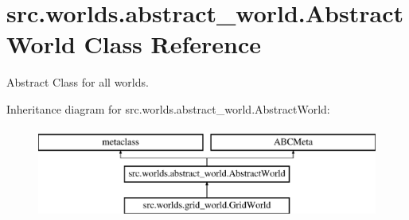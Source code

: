 \hypertarget{classsrc_1_1worlds_1_1abstract__world_1_1_abstract_world}{}\section{src.\+worlds.\+abstract\+\_\+world.\+Abstract\+World Class Reference}
\label{classsrc_1_1worlds_1_1abstract__world_1_1_abstract_world}


Abstract Class for all worlds.  


Inheritance diagram for src.\+worlds.\+abstract\+\_\+world.\+Abstract\+World\+:\begin{figure}[H]
\begin{center}
\leavevmode
\includegraphics[height=3.000000cm]{classsrc_1_1worlds_1_1abstract__world_1_1_abstract_world}
\end{center}
\end{figure}
